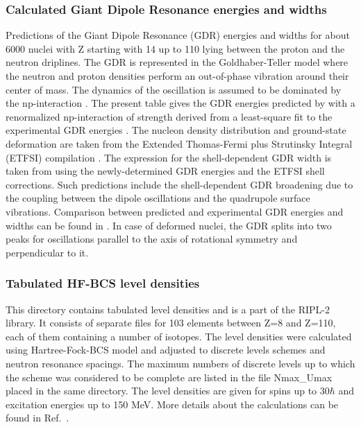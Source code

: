 \documentclass[twocolumn,amsmath,amssymb,10pt,groupedaddress,a4paper]{revtex4}
\begin{document}
\subsubsection{Calculated Giant Dipole Resonance energies and widths}
Predictions of the Giant Dipole Resonance (GDR) energies and widths
for about 6000 nuclei with Z starting with 14 up to 110 lying between
the proton and the neutron driplines. The GDR is represented in the
Goldhaber-Teller model \cite{Goldhaber48} where the neutron and proton
densities perform an out-of-phase vibration around their center of
mass. The dynamics of the oscillation is assumed to be dominated by
the np-interaction \cite{Isacker92}. The present table gives the
GDR energies predicted by \cite{Isacker92} with a renormalized np-interaction
of strength derived from a least-square fit to the experimental GDR
energies \cite{Goriely98}. The nucleon density distribution and ground-state
deformation are taken from the Extended Thomas-Fermi plus Strutinsky
Integral (ETFSI) compilation \cite{Goriely2000,Aboussir95}. The expression
for the shell-dependent GDR width is taken from \cite{Thielemann1983}
using the newly-determined GDR energies and the ETFSI shell corrections.
Such predictions include the shell-dependent GDR broadening due to
the coupling between the dipole oscillations and the quadrupole surface
vibrations. Comparison between predicted and experimental GDR energies
and widths can be found in \cite{Goriely98}. In case of deformed
nuclei, the GDR splits into two peaks for oscillations parallel to
the axis of rotational symmetry and perpendicular to it.

\subsubsection{Tabulated HF-BCS level densities}
This directory contains tabulated level densities
and is a part of the RIPL-2 library. It consists of separate
files for 103 elements between Z=8 and Z=110, each of them containing
a number of isotopes. The level densities were calculated using Hartree-Fock-BCS
model and adjusted to discrete levels schemes and neutron resonance
spacings. The maximum numbers of discrete levels up to which the scheme
was considered to be complete are listed in the file Nmax\_Umax placed
in the same directory. The level densities are given for spins up
to 30$\hbar$ and excitation energies up to 150 MeV. More details
about the calculations can be found in Ref.~\cite{HFBCS}.
\end{document}
